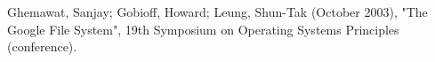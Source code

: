 \documentclass[conference]{IEEEtran}
\begin{document}















%
%
%
\begin{thebibliography}{1}


Ghemawat, Sanjay; Gobioff, Howard; Leung, Shun-Tak (October 2003), "The Google File System", 19th Symposium on Operating Systems Principles (conference).

\end{thebibliography}




\end{document}
